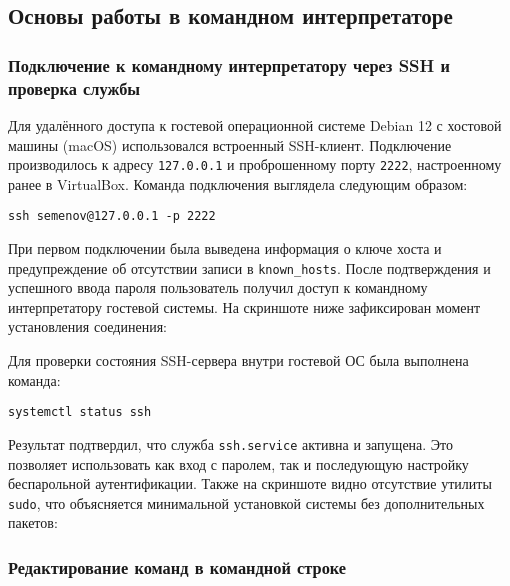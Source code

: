 \subsection{Основы работы в командном интерпретаторе}

\subsubsection{Подключение к командному интерпретатору через SSH и проверка службы}

Для удалённого доступа к гостевой операционной системе Debian 12 с хостовой машины (macOS) использовался встроенный SSH-клиент. Подключение производилось к адресу \texttt{127.0.0.1} и проброшенному порту \texttt{2222}, настроенному ранее в VirtualBox. Команда подключения выглядела следующим образом:

\begin{verbatim}
ssh semenov@127.0.0.1 -p 2222
\end{verbatim}

При первом подключении была выведена информация о ключе хоста и предупреждение об отсутствии записи в \texttt{known\_hosts}. После подтверждения и успешного ввода пароля пользователь получил доступ к командному интерпретатору гостевой системы. На скриншоте ниже зафиксирован момент установления соединения:


Для проверки состояния SSH-сервера внутри гостевой ОС была выполнена команда:

\begin{verbatim}
systemctl status ssh
\end{verbatim}

Результат подтвердил, что служба \texttt{ssh.service} активна и запущена. Это позволяет использовать как вход с паролем, так и последующую настройку беспарольной аутентификации. Также на скриншоте видно отсутствие утилиты \texttt{sudo}, что объясняется минимальной установкой системы без дополнительных пакетов:


\subsubsection{Редактирование команд в командной строке}

